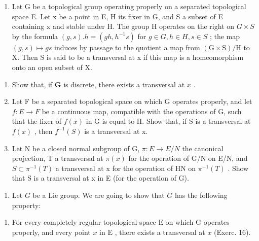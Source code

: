 \begin{enumerate}
\def\labelenumi{\arabic{enumi})}
\setcounter{enumi}{15}
\tightlist
\item
  Let G be a topological group operating properly on a separated topological space E. Let x be a point in E, H its fixer in G, and S a subset of E containing x and stable under H. The group H operates on the right on \(G \times S\) by the formula \((g, s).h = (gh, h^{-1}s)\) for \(g \in G, h \in H, s \in S\) ; the map \((g, s) \mapsto gs\) induces by passage to the quotient a map from \((\mathrm{G} \times \mathrm{S})/\mathrm{H}\) to X. Then S is said to be a transversal at x if this map is a homeomorphism onto an open subset of X.
\end{enumerate}

\begin{enumerate}
\def\labelenumi{\alph{enumi})}
\item
  Show that, if \(\mathbf{G}\) is discrete, there exists a transversal at \(x\) .
\item
  Let F be a separated topological space on which G operates properly, and let \(f : E \to F\) be a continuous map, compatible with the operations of G, such that the fixer of \(f(x)\) in G is equal to H. Show that, if S is a transversal at \(f(x)\) , then \(f^{-1}(S)\) is a transversal at x.
\item
  Let N be a closed normal subgroup of G, \(\pi: E \to E/N\) the canonical projection, T a transversal at \(\pi(x)\) for the operation of G/N on E/N, and \(S \subset \pi^{-1}(T)\) a transversal at x for the operation of HN on \(\pi^{-1}(T)\) . Show that S is a transversal at x in E (for the operation of G).
\end{enumerate}

\begin{enumerate}
\def\labelenumi{\arabic{enumi})}
\setcounter{enumi}{16}
\tightlist
\item
  Let \(G\) be a Lie group. We are going to show that \(G\) has the following property:
\end{enumerate}

\begin{enumerate}
\def\labelenumi{(\Alph{enumi})}
\setcounter{enumi}{19}
\tightlist
\item
  For every completely regular topological space \(\mathrm{E}\) on which \(\mathrm{G}\) operates properly, and every point \(x\) in \(\mathrm{E}\) , there exists a transversal at \(x\) (Exerc. 16).
\end{enumerate}

